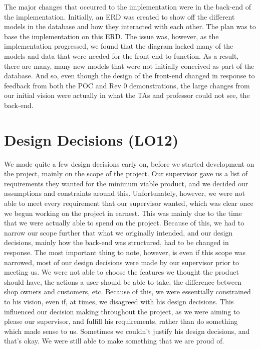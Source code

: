 \documentclass{article}
\begin{document}
The major changes that occurred to the implementation were in the back-end of the implementation. Initially, an ERD was created to show off the different models in the database and how they interacted with each other. The plan was to base the implementation on this ERD. The issue was, however, as the implementation progressed, we found that the diagram lacked many of the models and data that were needed for the front-end to function. As a result, there are many, many new models that were not initially conceived as part of the database. And so, even though the design of the front-end changed in response to feedback from both the POC and Rev 0 demonstrations, the large changes from our initial vision were actually in what the TAs and professor could not see, the back-end.

\section{Design Decisions (LO12)}


We made quite a few design decisions early on, before we started development on the project, mainly on the scope of the project. Our supervisor gave us a list of requirements they wanted for the minimum viable product, and we decided our assumptions and constraints around this. Unfortunately, however, we were not able to meet every requirement that our supervisor wanted, which was clear once we begun working on the project in earnest. This was mainly due to the time that we were actually able to spend on the project. Because of this, we had to narrow our scope further that what we originally intended, and our design decisions, mainly how the back-end was structured, had to be changed in response.
The most important thing to note, however, is even if this scope was narrowed, most of our design decisions were made by our supervisor prior to meeting us. We were not able to choose the features we thought the product should have, the actions a user should be able to take, the difference between shop owners and customers, etc. Because of this, we were essentially constrained to his vision, even if, at times, we disagreed with his design decisions. This influenced our decision making throughout the project, as we were aiming to please our supervisor, and fulfill his requirements, rather than do something which made sense to us. Sometimes we couldn't justify his design decisions, and that's okay. We were still able to make something that we are proud of.
\end{document}

